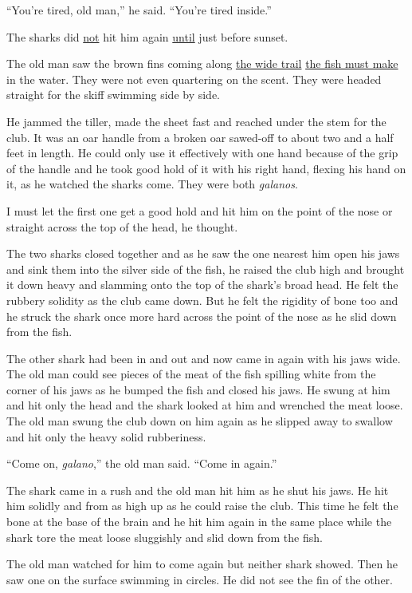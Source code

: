 \documentclass[fontset=ubuntu]{ctexrep}
\begin{document}
``You're tired, old man,'' he said. ``You're tired inside.''

The sharks did \uline{not} hit him again \uline{until} just before sunset.

The old man saw the brown fins coming along \uline{the wide trail} \uline{the fish
  must make} in the water. They were not even quartering on the scent. They
were headed straight for the skiff swimming side by side.

He jammed the tiller, made the sheet fast and reached under the stem for the
club. It was an oar handle from a broken oar \gls{sawed-off} to about two
and a half feet in length. He could only use it \gls{effectively} with one
hand because of the \gls{grip} of the handle and he took good hold of it with his
right hand, \gls{flexing} his hand on it, as he watched the sharks come.
They were both \emph{galanos}.

I must let the first one get a good hold and hit him on the point of the
nose or straight across the top of the head, he thought.

The two sharks closed together and as he saw the one nearest him open his
jaws and \gls{sink} them into the silver side of the fish, he raised the club high
and brought it down heavy and \gls{slamming} onto the top of the shark's
broad head. He felt the \gls{rubbery} \gls{solidity} as the club came down.
But he felt the \gls{rigidity} of bone too and he struck the shark once more
hard across the point of the nose as he slid down from the fish.

The other shark had been in and out and now came in again with his jaws
wide. The old man could see pieces of the meat of the fish \gls{spilling}
white from the corner of his jaws as he bumped the fish and closed his jaws.
He swung at him and hit only the head and the shark looked at him and
\gls{wrenched} the meat loose. The old man swung the club down on him again as he
slipped away to swallow and hit only the heavy solid \gls{rubberiness}.

``Come on, \emph{galano},'' the old man said. ``Come in again.''

The shark came in a rush and the old man hit him as he shut his jaws. He hit
him solidly and from as high up as he could raise the club. This time he
felt the bone at the base of the brain and he hit him again in the same
place while the shark tore the meat loose \gls{sluggishly} and slid down from the
fish.

The old man watched for him to come again but neither shark showed. Then he
saw one on the surface swimming in circles. He did not see the fin of the
other.
\end{document}
